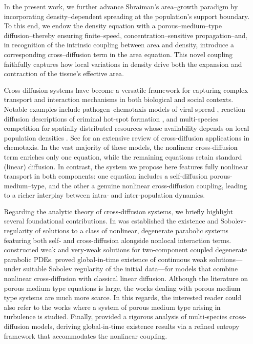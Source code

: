\documentclass[12pt]{amsart}
\begin{document}
In the present work, we further advance Shraiman's area--growth paradigm by incorporating density--dependent spreading at the population's support boundary.  To this end, we endow the density equation with a porous--medium--type diffusion--thereby ensuring finite--speed, concentration--sensitive propagation--and, in recognition of the intrinsic coupling between area and density, introduce a corresponding cross--diffusion term in the area equation.  This novel coupling faithfully captures how local variations in density drive both the expansion and contraction of the tissue's effective area.


Cross‐diffusion systems have become a versatile framework for capturing complex transport and interaction mechanisms in both biological and social contexts. Notable examples include pathogen–chemotaxis models of viral spread \cite{Stancevic2013,Painter2019}, reaction–diffusion descriptions of criminal hot‐spot formation \cite{Short2008,Rodriguez2020}, and multi‐species competition for spatially distributed resources whose availability depends on local population densities \cite{Tsyganov2003,Tania2012,Tello2016,Cintra2018,Tao2019}. See \cite{bellomo2022chemotaxis} for an extensive review of cross-diffusion applications in chemotaxis. In the vast majority of these models, the nonlinear cross‐diffusion term enriches only one equation, while the remaining equations retain standard (linear) diffusion. In contrast, the system we propose here features fully nonlinear transport in both components: one equation includes a self‐diffusion porous‐medium–type, and the other a genuine nonlinear cross‐diffusion coupling, leading to a richer interplay between intra‐ and inter‐population dynamics.

Regarding the analytic theory of cross‐diffusion systems, we briefly highlight several foundational contributions. In \cite{Alasio2022} was established the existence and Sobolev‐regularity of solutions to a class of nonlinear, degenerate parabolic systems featuring both self‐ and cross‐diffusion alongside nonlocal interaction terms.  \cite{Mielke2023} constructed weak and very‐weak solutions for two‐component coupled degenerate parabolic PDEs.  \cite{Winkler2025} proved global‐in‐time existence of continuous weak solutions—under suitable Sobolev regularity of the initial data—for models that combine nonlinear cross‐diffusion with classical linear diffusion. Although the literature on porous medium type equations is large, the works dealing with porous medium type systems are much more scarce. In this regards, the interested reader could also refer to the works \cite{bulivcek2019large,cuvillier2023well,fanelli2022finite,Fanelli2023, kosewski2025local,mielke2023two,mielke2022existence} where a system of porous medium type arising in turbulence is studied. Finally,  \cite{chen2018global} provided a rigorous analysis of multi‐species cross‐diffusion models, deriving global‐in‐time existence results via a refined entropy framework that accommodates the nonlinear coupling. 
\end{document}
